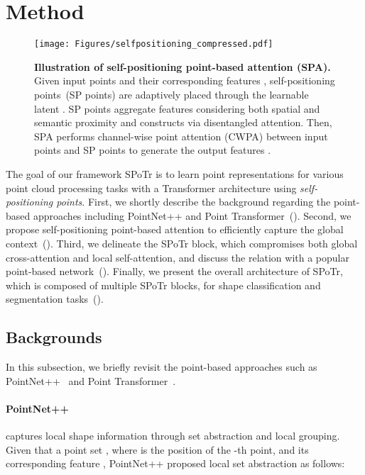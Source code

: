 \documentclass[10pt,twocolumn,letterpaper]{article}
\begin{document}
%
 \section{Method}
    \label{sec:3}
\begin{figure*}[t] 
\centering
\texttt{[image: Figures/selfpositioning\_compressed.pdf]}
\caption{{{\textbf{Illustration of self-positioning point-based attention (SPA).} Given input points  and their corresponding features , self-positioning points~(SP points)  are adaptively placed through the learnable latent . SP points aggregate features considering both spatial and semantic proximity and constructs  via disentangled attention. Then, SPA performs channel-wise point attention (CWPA) between input points and SP points to generate the output features .
}}}
\label{fig:fig2}
\end{figure*} 
The goal of our framework SPoTr is to learn point representations for various point cloud processing tasks with a Transformer architecture using \textit{self-positioning points}.
First, we shortly describe the background regarding the point-based approaches including PointNet++ and Point Transformer~(). 
Second, we propose self-positioning point-based attention to efficiently capture the global context~().
Third, we delineate the SPoTr block, which compromises both global cross-attention and local self-attention, and discuss the relation with a popular point-based network~(). 
Finally, we present the overall architecture of SPoTr, which is composed of multiple SPoTr blocks, for shape classification and segmentation tasks~().



     \subsection{Backgrounds}
    \label{sec:3.1}




In this subsection, we briefly revisit the point-based approaches such as  PointNet++~\cite{qi2017pointnet++} and Point Transformer~\cite{zhao2021point}.









\paragraph{PointNet++~\cite{qi2017pointnet++}} captures local shape information through set abstraction and local grouping.
Given that a point set , where  is the position of the -th point, and its corresponding feature , PointNet++ proposed local set abstraction as follows:
\end{document}
